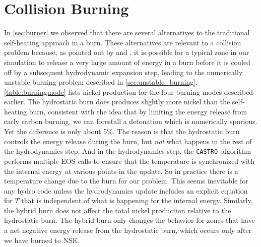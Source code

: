 \documentclass[twocolumn,numberedappendix]{../aastex6}
\newcommand{\castro}{\texttt{CASTRO}}
\begin{document}
\section{Collision Burning}
\label{sec:collisionburning}


In \autoref{sec:burner} we observed that there are several alternatives to the traditional
self-heating approach in a burn. These alternatives are relevant to a collision problem because,
as pointed out by \cite{raskin:2010} and \cite{kushnir:2013}, it is possible for a typical
zone in our simulation to release a very large amount of energy in a burn before it is cooled
off by a subsequent hydrodynamic expansion step, leading to the numerically unstable burning
problem described in \autoref{sec:unstable_burning}. \autoref{table:burningmode} lists nickel
production for the four burning modes described earlier. The hydrostatic burn does produces
slightly more nickel than the self-heating burn, consistent with the idea that by limiting the
energy release from early carbon burning, we can forestall a detonation which is numerically
spurious. Yet the difference is only about 5\%. The reason is that the hydrostatic burn controls
the energy release during the burn, but \textit{not} what happens in the rest of the hydrodynamics
step. And in the hydrodynamics step, the \castro\ algorithm performs multiple EOS calls to ensure
that the temperature is synchronized with the internal energy at various points in the update.
So in practice there is a temperature change due to the burn for our problem. This seems inevitable
for any hydro code unless the hydrodynamics update includes an explicit equation for $T$ that is
independent of what is happening for the internal energy. Similarly, the hybrid burn does not
affect the total nickel production relative to the hydrostatic burn. The hybrid burn only changes
the behavior for zones that have a net negative energy release from the hydrostatic burn, which
occurs only after we have burned to NSE.


\end{document}

